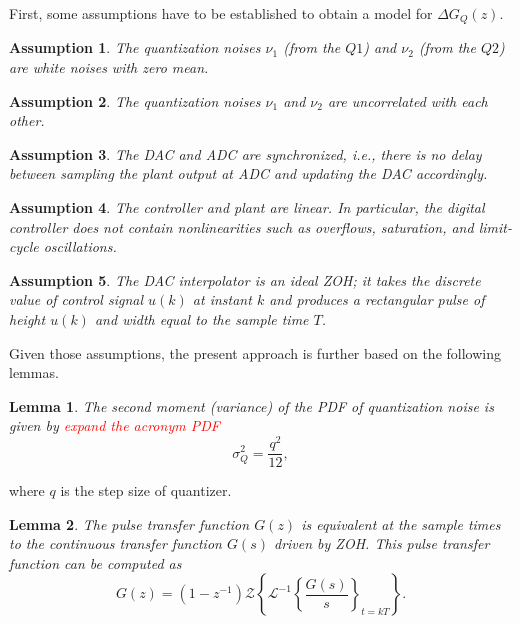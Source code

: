 \documentclass{sig-alternate-05-2015}
\newtheorem{myassumption}{Assumption}
\newtheorem{mylemma}{Lemma}
\begin{document}

First, some assumptions have to be established to obtain a model for
$\Delta{G_{Q}(z)}$.
%
\begin{myassumption}
\label{whitenoise}
%
The quantization noises $\nu_{1}$ (from the $Q1$) and $\nu_{2}$ (from the
$Q2$) are white noises with zero mean.
%
\end{myassumption}

\begin{myassumption}
The quantization noises $\nu_{1}$ and $\nu_{2}$ are uncorrelated with each other.
\end{myassumption}

\begin{myassumption}
%
The DAC and ADC are synchronized, {\it i.e.}, there is no delay between
sampling the plant output at ADC and updating the DAC accordingly.
%
\end{myassumption}

\begin{myassumption}
%
The controller and plant are linear.  In particular, the digital controller
does not contain nonlinearities such as overflows, saturation, and
limit-cycle oscillations.
%
\end{myassumption}

\begin{myassumption}
%
The DAC interpolator is an ideal ZOH; it takes the discrete value of control
signal $u(k)$ at instant $k$ and produces a rectangular pulse of height
$u(k)$ and width equal to the sample time $T$.
%
\end{myassumption}

Given those assumptions, the present approach is further based on the following lemmas.
%
\begin{mylemma}
%
\cite{widrow1956} The second moment (variance) of the PDF of quantization
noise is given by \textcolor{red}{expand the acronym PDF}
%
\begin{equation}
\label{eq:variancelemma}
\sigma_{Q}^{2}=\frac{q^{2}}{12},
\end{equation}
\end{mylemma}

\noindent where $q$ is the step size of quantizer.

\begin{mylemma} \cite{astrom1997computer}
%
The pulse transfer function $G(z)$ is equivalent at the sample times to the
continuous transfer function $G(s)$ driven by ZOH.  This pulse transfer
function can be computed as
%
\begin{equation}
\label{eq:pulsetf}
G(z)=(1-z^{-1})\mathcal{Z}\left\lbrace{\mathcal{L}^{-1}\left\lbrace{\frac{G(s)}{s}}\right\rbrace_{t=kT}}\right\rbrace.
\end{equation}
\end{mylemma}
\end{document}
